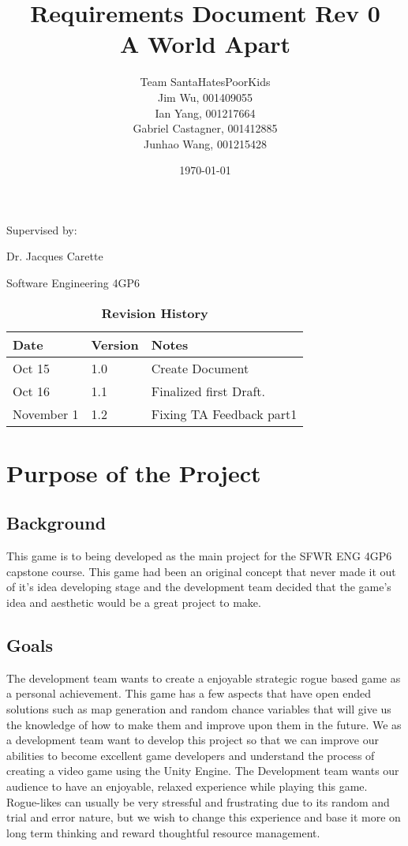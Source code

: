 \documentclass{article}
\title{Requirements Document Rev 0\\A World Apart}
\author{Team SantaHatesPoorKids
		\\ Jim Wu, 001409055
		\\ Ian Yang, 001217664
		\\ Gabriel Castagner, 001412885
		\\ Junhao Wang, 001215428
}
\date{\today}
\begin{document}
\begin{titlepage}
\maketitle
\vfill
{\centering
Supervised by:\par 
Dr. Jacques Carette \par
Software Engineering 4GP6 \par
\begin{table}[bp]
\caption{\bf Revision History}
\begin{tabularx}{\textwidth}{p{3cm}p{2cm}X}
\toprule {\bf Date} & {\bf Version} & {\bf Notes}\\
\midrule
Oct 15 & 1.0 & Create Document\\
Oct 16 & 1.1 & Finalized first Draft.\\
November 1 & 1.2 & Fixing TA Feedback part1\\
\bottomrule
\end{tabularx}
\end{table}
}

\end{titlepage}


\tableofcontents
\newpage


\section{Purpose of the Project}
\subsection{Background}

\quad This game is to being developed as the main project for the SFWR ENG 4GP6 capstone course. This game had been an original concept that never made it out of it's idea developing stage and the development team decided that the game's idea and aesthetic would be a great project to make.
\subsection{Goals}
\quad The development team wants to create a enjoyable strategic rogue based game as a personal achievement. This game has a few aspects that have open ended solutions such as map generation and random chance variables that will give us the knowledge of how to make them and improve upon them in the future. We as a development team want to develop this project so that we can improve our abilities to become excellent game developers and understand the process of creating a video game using the Unity Engine. The Development team wants our audience to have an enjoyable, relaxed experience while playing this game. Rogue-likes can usually be very stressful and frustrating due to its random and trial and error nature, but we wish to change this experience and base it more on long term thinking and reward thoughtful resource management.
\end{document}
